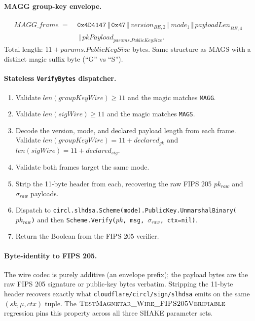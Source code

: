 \paragraph{MAGG group-key envelope.}
\begin{align*}
  \mathit{MAGG\_frame} \;=\; & \mathtt{0x4D4147} \,\Vert\,
    \mathtt{0x47} \,\Vert\, \mathit{version}_{\mathit{BE},2} \,\Vert\,
    \mathit{mode}_1 \,\Vert\, \mathit{payloadLen}_{\mathit{BE},4} \\
  & \,\Vert\, \mathit{pkPayload}_{params.PublicKeySize}.
\end{align*}
Total length: $11 + params.PublicKeySize$ bytes. Same structure as
MAGS with a distinct magic suffix byte (``G'' vs ``S'').

\paragraph{Stateless \texttt{VerifyBytes} dispatcher.}
\begin{enumerate}[leftmargin=2em,nosep]
  \item Validate $len(groupKeyWire) \ge 11$ and the magic matches
        \texttt{MAGG}.
  \item Validate $len(sigWire) \ge 11$ and the magic matches
        \texttt{MAGS}.
  \item Decode the version, mode, and declared payload length from
        each frame. Validate
        $len(groupKeyWire) = 11 + declared_{gk}$ and
        $len(sigWire) = 11 + declared_{sig}$.
  \item Validate both frames target the same mode.
  \item Strip the 11-byte header from each, recovering the raw
        FIPS 205 $pk_{raw}$ and $\sigma_{raw}$ payloads.
  \item Dispatch to
        \texttt{circl.slhdsa.Scheme(mode).PublicKey.UnmarshalBinary(
        $pk_{raw}$)} and then
        \texttt{Scheme.Verify($pk$, msg, $\sigma_{raw}$, ctx=nil)}.
  \item Return the Boolean from the FIPS 205 verifier.
\end{enumerate}

\paragraph{Byte-identity to FIPS 205.} The wire codec is purely
additive (an envelope prefix); the payload bytes are the raw FIPS
205 signature or public-key bytes verbatim. Stripping the 11-byte
header recovers exactly what \texttt{cloudflare/circl/sign/slhdsa}
emits on the same $(sk, \mu, \mathit{ctx})$ tuple. The
$\textsc{TestMagnetar\_Wire\_FIPS205Verifiable}$ regression pins
this property across all three SHAKE parameter sets.

